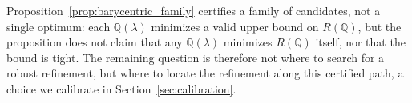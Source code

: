 Proposition~\ref{prop:barycentric_family} certifies a family of candidates, not a single optimum: each $\mathbb{Q}(\lambda)$ minimizes a valid upper bound on $R(\mathbb{Q})$, but the proposition does not claim that any $\mathbb{Q}(\lambda)$  minimizes $R(\mathbb{Q})$ itself, nor that the bound is tight. 
The remaining question is therefore not where to search for a robust refinement, but where to locate the refinement along this certified path, a choice we calibrate in Section~\ref{sec:calibration}.%





